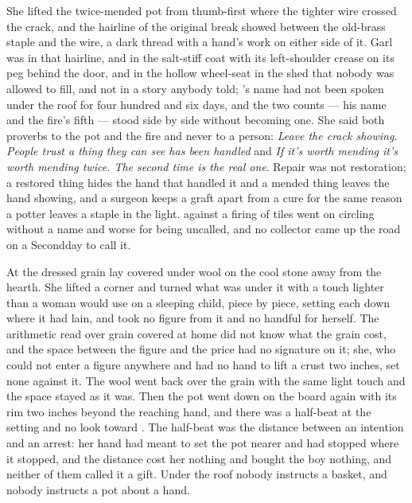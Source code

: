 She lifted the twice-mended pot from  thumb-first where the tighter wire crossed the crack, and the hairline of the original break showed between the old-brass staple and the wire, a dark thread with a hand's work on either side of it. Garl was in that hairline, and in the salt-stiff coat with its left-shoulder crease on its peg behind the door, and in the hollow wheel-seat in the shed that nobody was allowed to fill, and not in a story anybody told; 's name had not been spoken under the roof for four hundred and six days, and the two counts --- his name and the fire's fifth --- stood side by side without becoming one. She said both proverbs to the pot and the fire and never to a person: \emph{Leave the crack showing. People trust a thing they can see has been handled} and \emph{If it's worth mending it's worth mending twice. The second time is the real one}. Repair was not restoration; a restored thing hides the hand that handled it and a mended thing leaves the hand showing, and a surgeon keeps a graft apart from a cure for the same reason a potter leaves a staple in the light.  against a firing of tiles went on circling without a name and worse for being uncalled, and no collector came up the road on a Secondday to call it.

At  the dressed grain lay covered under wool on the cool stone away from the hearth. She lifted a corner and turned what was under it with a touch lighter than a woman would use on a sleeping child, piece by piece, setting each down where it had lain, and took no figure from it and no handful for herself. The arithmetic read over grain covered at home did not know what the grain cost, and the space between the figure and the price had no signature on it; she, who could not enter a figure anywhere and had no hand to lift a crust two inches, set none against it. The wool went back over the grain with the same light touch and the space stayed as it was. Then the pot went down on the board again with its rim two inches beyond the reaching hand, and there was a half-beat at the setting and no look toward . The half-beat was the distance between an intention and an arrest: her hand had meant to set the pot nearer and had stopped where it stopped, and the distance cost her nothing and bought the boy nothing, and neither of them called it a gift. Under the roof nobody instructs a basket, and nobody instructs a pot about a hand.

